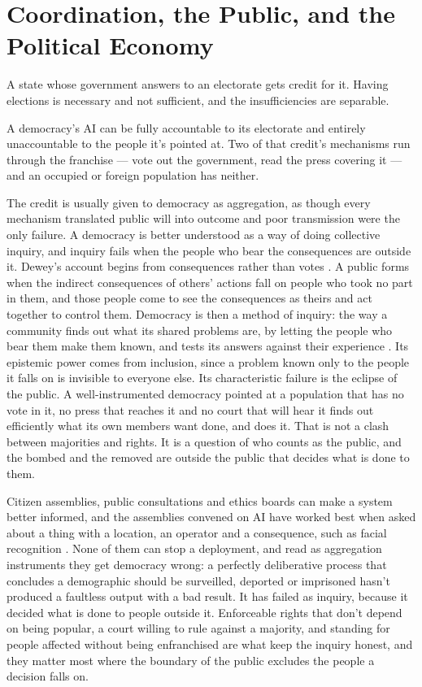 \chapter{Coordination, the Public, and the Political Economy}
\label{sec:27}
A state whose government answers to an electorate gets credit for it. Having elections is necessary and not sufficient, and the insufficiencies are separable.

A democracy's AI can be fully accountable to its electorate and entirely unaccountable to the people it's pointed at. Two of that credit's mechanisms run through the franchise — vote out the government, read the press covering it — and an occupied or foreign population has neither.

The credit is usually given to democracy as aggregation, as though every mechanism translated public will into outcome and poor transmission were the only failure. A democracy is better understood as a way of doing collective inquiry, and inquiry fails when the people who bear the consequences are outside it. Dewey's account begins from consequences rather than votes \autocite{dewey1927public}. A public forms when the indirect consequences of others' actions fall on people who took no part in them, and those people come to see the consequences as theirs and act together to control them. Democracy is then a method of inquiry: the way a community finds out what its shared problems are, by letting the people who bear them make them known, and tests its answers against their experience \autocite{anderson2006epistemology}. Its epistemic power comes from inclusion, since a problem known only to the people it falls on is invisible to everyone else. Its characteristic failure is the eclipse of the public. A well-instrumented democracy pointed at a population that has no vote in it, no press that reaches it and no court that will hear it finds out efficiently what its own members want done, and does it. That is not a clash between majorities and rights. It is a question of who counts as the public, and the bombed and the removed are outside the public that decides what is done to them.

Citizen assemblies, public consultations and ethics boards can make a system better informed, and the assemblies convened on AI have worked best when asked about a thing with a location, an operator and a consequence, such as facial recognition \autocite{adalovelaceinstitute2021biometrics}. None of them can stop a deployment, and read as aggregation instruments they get democracy wrong: a perfectly deliberative process that concludes a demographic should be surveilled, deported or imprisoned hasn't produced a faultless output with a bad result. It has failed as inquiry, because it decided what is done to people outside it. Enforceable rights that don't depend on being popular, a court willing to rule against a majority, and standing for people affected without being enfranchised are what keep the inquiry honest, and they matter most where the boundary of the public excludes the people a decision falls on.

